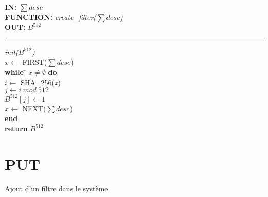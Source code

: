 \begin{flushleft}
	\begin{framed}
		\textbf{IN:} $\sum desc$\\
		\textbf{FUNCTION:} \textit{create\_filter($\sum desc$)}\\
		\textbf{OUT:} \textit{$B^{512}$}\\

		\noindent\rule{\linewidth}{0.5pt}

		\begin{tabbing}
			\textit{init($B^{512}$)}\\
			$x \leftarrow$ FIRST($\sum desc$)\\
			\textbf{while} \= $x \neq \emptyset$ \textbf{do}\\
					\> $i \leftarrow$ SHA\_256(\textit{x})\\
					\> $j \leftarrow i\ mod\ 512$\\
					\> $B^{512}[j]\leftarrow 1$\\
					\> $x \leftarrow$ NEXT($\sum desc$)\\
			\textbf{end}\\
			\textbf{return} $B^{512}$\\
	    	\end{tabbing}		
	\end{framed}
\end{flushleft}

\newpage
\section{PUT}
\begin{algorithme}
	Ajout d'un filtre dans le système
\end{algorithme}

